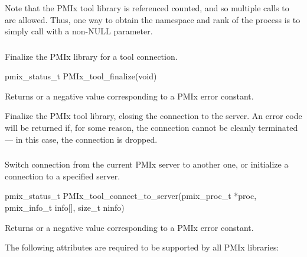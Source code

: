 Note that the \ac{PMIx} tool library is referenced counted, and so multiple calls to  are allowed.
Thus, one way to obtain the namespace and rank of the process is to simply call  with a non-NULL parameter.


\subsubsection{}

\summary

Finalize the \ac{PMIx} library for a tool connection.

\format

\cspecificstart
\begin{codepar}
pmix_status_t
PMIx_tool_finalize(void)
\end{codepar}
\cspecificend

Returns  or a negative value corresponding to a PMIx error constant.

\descr

Finalize the PMIx tool library, closing the connection to the server.
An error code will be returned if, for some reason, the connection cannot be cleanly terminated --- in this case, the connection is dropped.


\subsubsection{}

\summary

Switch connection from the current \ac{PMIx} server to another one, or initialize a connection to a specified server.

\format

\cspecificstart
\begin{codepar}
pmix_status_t
PMIx_tool_connect_to_server(pmix_proc_t *proc,
                            pmix_info_t info[], size_t ninfo)
\end{codepar}
\cspecificend

Returns  or a negative value corresponding to a PMIx error constant.

\reqattrstart
The following attributes are required to be supported by all \ac{PMIx} libraries:

